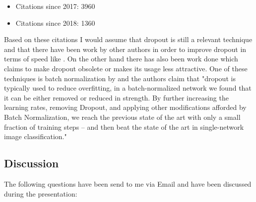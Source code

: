 \documentclass[a4paper]{article}
\begin{document}
\begin{itemize}
	\item Citations since 2017: 3960
	\item Citations since 2018: 1360
\end{itemize}

Based on these citations I would assume that dropout is still a relevant technique and that there have been work by other authors in order to improve dropout in terms of speed like \cite{wang2013fast}. On the other hand there has also been work done which claims to make dropout obsolete or  makes its usage less attractive. One of these techniques is batch normalization by \cite{ioffe2015batch} and the authors claim that "dropout is typically used to reduce overfitting, in a batch-normalized network we found that it can be either removed or reduced in strength. By further increasing the learning rates, removing Dropout, and applying other modifications afforded by Batch Normalization, we reach the previous
state of the art with only a small fraction of training steps – and then beat the state of the art in single-network image classification."


\subsection{Discussion}


The following questions have been send to me via Email and have been discussed during the presentation:
\end{document}
